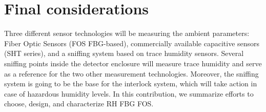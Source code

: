 \section{Final considerations}
Three different sensor technologies will be measuring the ambient parameters: Fiber Optic Sensors (FOS FBG-based), commercially available capacitive sensors (SHT series), and a sniffing system based on trace humidity sensors.
Several sniffing points inside the detector enclosure will measure trace humidity and serve as a  reference for the two other measurement technologies. Moreover, the sniffing system is going to be the base for the interlock system, which will take action in case of hazardous humidity levels. In this contribution, we summarize efforts to choose, design, and characterize RH FBG FOS.